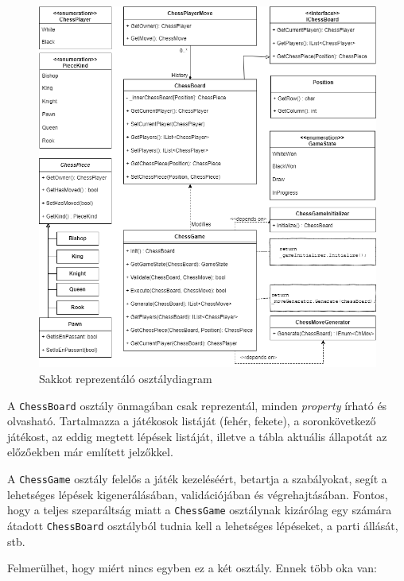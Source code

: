 \documentclass[twoside, a4paper, 12pt]{article}
\begin{document}
\begin{figure}[htbp]
	\centering
	\includegraphics[width=\textwidth]{img/chessClassDiagram.png}
	\caption{Sakkot reprezentáló osztálydiagram}
	\label{fig:chessClassDiagram}
\end{figure}

A \texttt{ChessBoard} osztály önmagában csak reprezentál, minden \textit{property} írható és olvasható. Tartalmazza a játékosok listáját (fehér, fekete), a soronkövetkező játékost, az eddig megtett lépések listáját, illetve a tábla aktuális állapotát az előzőekben már említett jelzőkkel.

A \texttt{ChessGame} osztály felelős a játék kezeléséért, betartja a szabályokat, segít a lehetséges lépések kigenerálásában, validációjában és végrehajtásában. Fontos, hogy a teljes szeparáltság miatt a \texttt{ChessGame} osztálynak kizárólag egy számára átadott \texttt{ChessBoard} osztályból tudnia kell a lehetséges lépéseket, a parti állását, stb.

Felmerülhet, hogy miért nincs egyben ez a két osztály. Ennek több oka van:
\end{document}
